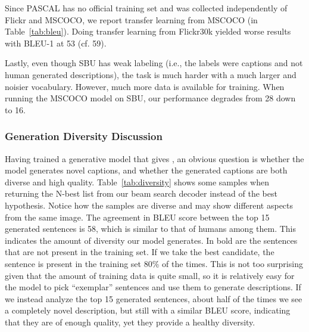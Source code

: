 Since PASCAL has no official training set and was collected independently of Flickr and MSCOCO, we
report transfer learning from MSCOCO (in Table~\ref{tab:bleu}). Doing transfer learning from
Flickr30k yielded worse results with BLEU-1 at 53 (cf. 59).

Lastly, even though SBU has weak labeling (i.e., the labels were captions and not
human generated descriptions), the task is much harder with a much larger and noisier
vocabulary. However, much more data is available for training. When running the MSCOCO
model on SBU, our performance degrades from 28 down to 16.

\subsubsection{Generation Diversity Discussion}

Having trained a generative model that gives , an obvious question is
whether the model generates novel captions, and whether the generated captions
are both diverse and high quality.
Table~\ref{tab:diversity} shows some samples when returning the N-best list from our
beam search decoder instead of the best hypothesis. Notice how the samples are
diverse and may show different aspects from the same image.
The agreement in BLEU score between the top 15 generated sentences is 58, which is similar to that of humans among them. This indicates the amount of diversity
our model generates.
In bold are the sentences that
are not present in the training set. If we take the best candidate, the
sentence is present in the training set 80\% of the times.
This is not too surprising given that the amount
of training data is quite small, so it is relatively easy for the model to pick ``exemplar''
sentences and use them to generate descriptions.
If we instead analyze the top 15 generated sentences, about half of the times we
see a completely novel description, but still with a similar BLEU score,
indicating that they are of enough quality, yet they
provide a healthy diversity.

